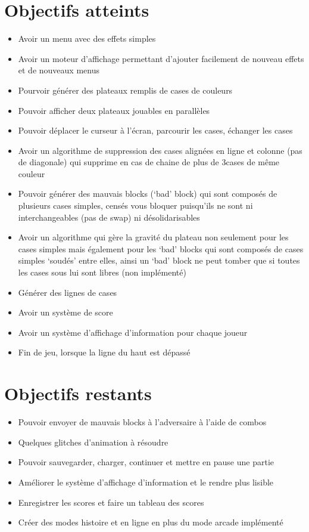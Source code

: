 \documentclass[]{article}
\begin{document}
\section*{Objectifs atteints}
\begin{itemize}
\itemsep5pt\parskip1pt
\item 
Avoir un menu avec des effets simples
\item 
Avoir un moteur d’affichage permettant d’ajouter facilement de nouveau effets et de
nouveaux menus
\item
 Pourvoir générer des plateaux remplis de cases de couleurs
\item
 Pouvoir afficher deux plateaux jouables en parallèles
\item 
Pouvoir déplacer le curseur à l’écran, parcourir les cases, échanger les cases
\item 
Avoir un algorithme de suppression des cases alignées en ligne et colonne (pas de diagonale)
qui supprime en cas de chaine de plus de 3cases de même couleur
\item 
Pouvoir générer des mauvais blocks (‘bad’ block) qui sont composés de plusieurs cases
simples, censés vous bloquer puisqu’ils ne sont ni interchangeables (pas de swap) ni désolidarisables
\item 
Avoir un algorithme qui gère la gravité du plateau non seulement pour les cases simples mais
également pour les ‘bad’ blocks qui sont composés de cases simples ‘soudés’ entre elles, ainsi un
‘bad’ block ne peut tomber que si toutes les cases sous lui sont libres (non implémenté)
\item 
Générer des lignes de cases
\item 
Avoir un système de score
\item
Avoir un système d'affichage d'information pour chaque joueur
\item 
Fin de jeu, lorsque la ligne du haut est dépassé
\end{itemize}

\section*{Objectifs restants}
\begin{itemize}
\itemsep5pt\parskip1pt
\item 
Pouvoir envoyer de mauvais blocks à l’adversaire à l’aide de combos
\item 
Quelques glitches d'animation à résoudre
\item 
Pouvoir sauvegarder, charger, continuer et mettre en pause une partie
\item
Améliorer le système d'affichage d'information et le rendre plus lisible
\item
Enregistrer les scores et faire un tableau des scores
\item 
Créer des modes histoire et en ligne en plus du mode arcade implémenté
\end{itemize}
\end{document}
